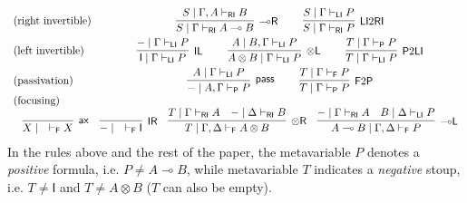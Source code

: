 \documentclass[copyright,creativecommons]{eptcs}
\theoremstyle{definition}
\newcommand{\tl}{\otimes \mathsf{L}}
\newcommand{\tr}{\otimes \mathsf{R}}
\newcommand{\lright}{{\multimap}\mathsf{R}}
\newcommand{\lleft}{{\multimap}\mathsf{L}}
\newcommand{\pass}{\mathsf{pass}}
\newcommand{\unitl}{\mathsf{IL}}
\newcommand{\unitr}{\mathsf{IR}}
\newcommand{\ax}{\mathsf{ax}}
\newcommand{\ot}{\otimes}
\newcommand{\lolli}{\multimap}
\newcommand{\I}{\mathsf{I}}
\newcommand{\RI}{\mathsf{RI}}
\newcommand{\LI}{\mathsf{LI}}
\newcommand{\Pass}{\mathsf{P}}
\newcommand{\F}{\mathsf{F}}
\newcommand{\proofbox}[1]{\begin{tabular}{l} #1 \end{tabular}}
\begin{document}
\begin{equation}\label{eq:naive}
  \begin{array}{lc}
    \text{(right invertible)} & %
    \proofbox{
    \infer[\lright]{S \mid \Gamma \vdash_{\RI} A \lolli B}{S \mid \Gamma , A \vdash_{\RI} B}
    \qquad
    \infer[\LI 2 \RI]{S \mid \Gamma \vdash_{\RI} P}{S \mid \Gamma \vdash_{\LI} P}
    }
    \\[9pt]
    \text{(left invertible)} & %
    \proofbox{
    \infer[\unitl]{\I \mid \Gamma \vdash_{\LI} P}{{-} \mid \Gamma \vdash_{\LI} P}
    \qquad
    \infer[\tl]{A \ot B \mid \Gamma \vdash_{\LI} P}{A \mid B , \Gamma \vdash_{\LI} P}
    \qquad
    \infer[\Pass 2 \LI]{T \mid \Gamma \vdash_{\LI} P}{T \mid \Gamma \vdash_{\Pass} P}
    }
    \\[9pt]
    \text{(passivation)} & %
    \proofbox{
      \infer[\pass]{{-} \mid A , \Gamma \vdash_{\Pass} P }{
      A\mid \Gamma \vdash_{\LI} P
    }
    \qquad
    \infer[\F 2 \Pass]{T \mid \Gamma \vdash_{\Pass} P}{
      T \mid \Gamma \vdash_{\F} P
    }
    }
    \\
    \text{(focusing)} &    \\ %
    \multicolumn{2}{c}{
    \hspace*{3mm}
    \infer[\ax]{X \mid \quad \vdash_{\F} X}{}
    \quad
    \infer[\unitr]{{-} \mid \quad \vdash_{\F} \I}{}
    \quad
    \infer[\tr]{T \mid \Gamma , \Delta \vdash_{\F} A \ot B}{
      T \mid \Gamma \vdash_{\RI} A
      &
      {-} \mid \Delta \vdash_{\RI} B
    }
    \quad
    \infer[\lleft]{A \lolli B \mid \Gamma , \Delta \vdash_{\F} P}{
      {-} \mid \Gamma \vdash_{\RI} A
      &
      B \mid \Delta \vdash_{\LI} P
    }
    }
  \end{array}
\end{equation}
In the rules above and the rest of the paper, the metavariable $P$ denotes a \emph{positive} formula, i.e. $P \not= A \lolli B$, while metavariable $T$ indicates a \emph{negative} stoup, i.e. $T \not= \I$ and $T\not= A \ot B$ ($T$ can also be empty).
\end{document}
